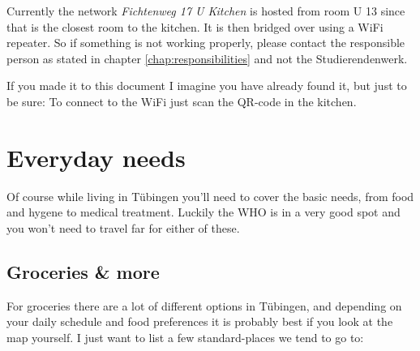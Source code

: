 Currently the network \textit{Fichtenweg 17 U Kitchen} is hosted from room U 13 since that is the closest room to the kitchen. It is then bridged over using a WiFi repeater. So if something is not working properly, please contact the responsible person as stated in chapter \ref{chap:responsibilities} and not the Studierendenwerk.

If you made it to this document I imagine you have already found it, but just to be sure: To connect to the WiFi just scan the QR-code in the kitchen.

\section{Everyday needs}
Of course while living in Tübingen you'll need to cover the basic needs, from food and hygene to medical treatment. Luckily the WHO is in a very good spot and you won't need to travel far for either of these.  

\subsection{Groceries \& more}
For groceries there are a lot of different options in Tübingen, and depending on your daily schedule and food preferences it is probably best if you look at the map yourself. I just want to list a few standard-places we tend to go to:

